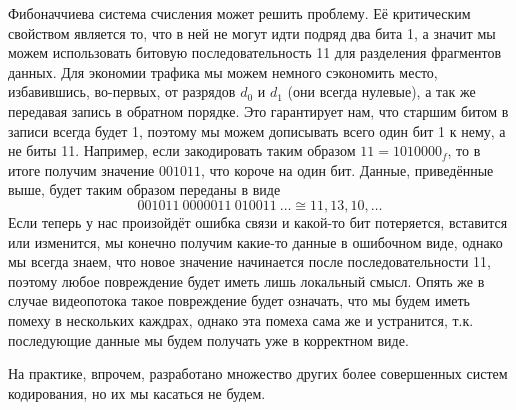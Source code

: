 Фибоначчиева система счисления может решить проблему. Её критическим свойством является то, что в ней не могут идти подряд два бита 1, а значит мы можем использовать битовую последовательность 11 для разделения фрагментов данных. Для экономии трафика мы можем немного сэкономить место, избавившись, во-первых, от разрядов $d_0$ и $d_1$ (они всегда нулевые), а так же передавая запись в обратном порядке. Это гарантирует нам, что старшим битом в записи всегда будет 1, поэтому мы можем дописывать всего один бит 1 к нему, а не биты 11. Например, если закодировать таким образом $11=1010000_f$, то в итоге получим значение $001011$, что короче на один бит. Данные, приведённые выше, будет таким образом переданы в виде
$$001011\ 0000011\ 010011\ \ldots \cong 11, 13, 10, \ldots$$
Если теперь у нас произойдёт ошибка связи и какой-то бит потеряется, вставится или изменится, мы конечно получим какие-то данные в ошибочном виде, однако мы всегда знаем, что новое значение начинается после последовательности 11, поэтому любое повреждение будет иметь лишь локальный смысл. Опять же в случае видеопотока такое повреждение будет означать, что мы будем иметь помеху в нескольких каждрах, однако эта помеха сама же и устранится, т.к. последующие данные мы будем получать уже в корректном виде.

На практике, впрочем, разработано множество других более совершенных систем кодирования, но их мы касаться не будем.